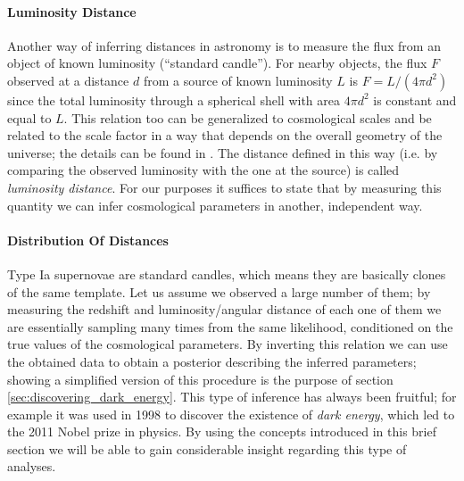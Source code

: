 \paragraph{Luminosity Distance}
Another way of inferring distances in astronomy is to measure the flux from an object of known luminosity (``standard candle''). For nearby objects, the flux $F$ observed at a distance $d$ from a source of known luminosity $L$ is $F=L/(4\pi d^2)$ since the total luminosity through a spherical shell with area $4\pi d^2$ is constant and equal to $L$.
This relation too can be generalized to cosmological scales and be related to the scale factor in a way that depends on the overall geometry of the universe; the details can be found in \cite{modern_cosmology}. The distance defined in this way (i.e. by comparing the observed luminosity with the one at the source) is called \emph{luminosity distance}.
For our purposes it suffices to state that by measuring this quantity we can infer cosmological parameters in another, independent way.


\paragraph{Distribution Of Distances}
Type Ia supernovae are standard candles, which means they are basically clones of the same template. Let us assume we observed a large number of them; by measuring the redshift and luminosity/angular distance of each one of them we are essentially sampling many times from the same likelihood, conditioned on the true values of the cosmological parameters. By inverting this relation we can use the obtained data to obtain a posterior describing the inferred parameters; showing a simplified version of this procedure is the purpose of section \ref{sec:discovering_dark_energy}.
This type of inference has always been fruitful; for example it was used in 1998 to discover the existence of \emph{dark energy}, which led to the 2011 Nobel prize in physics.
By using the concepts introduced in this brief section we will be able to gain considerable insight regarding this type of analyses.